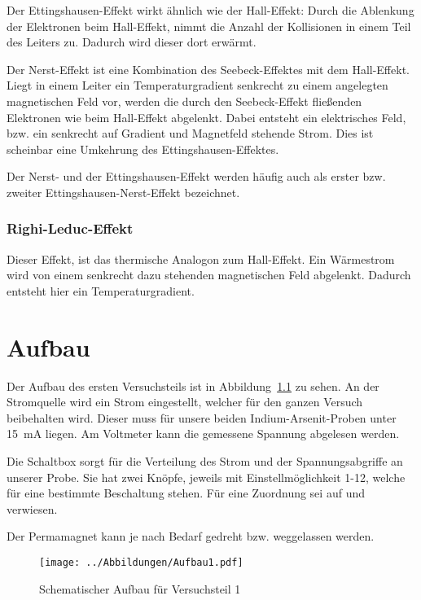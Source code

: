 Der Ettingshausen-Effekt wirkt ähnlich wie der Hall-Effekt: Durch die
Ablenkung der Elektronen beim Hall-Effekt, nimmt die Anzahl der Kollisionen in
einem Teil des Leiters zu. Dadurch wird dieser dort erwärmt.

Der Nerst-Effekt ist eine Kombination des Seebeck-Effektes mit dem Hall-Effekt.
Liegt in einem Leiter ein Temperaturgradient senkrecht zu einem angelegten
magnetischen Feld vor, werden die durch den Seebeck-Effekt fließenden
Elektronen wie beim Hall-Effekt abgelenkt. Dabei entsteht ein elektrisches
Feld, bzw. ein senkrecht auf Gradient und Magnetfeld stehende Strom. Dies ist
scheinbar eine Umkehrung des Ettingshausen-Effektes.

Der Nerst- und der Ettingshausen-Effekt werden häufig auch als erster bzw.
zweiter Ettingshausen-Nerst-Effekt bezeichnet.

\subsection{Righi-Leduc-Effekt}

Dieser Effekt, ist das thermische Analogon zum Hall-Effekt. Ein Wärmestrom wird
von einem senkrecht dazu stehenden magnetischen Feld abgelenkt. Dadurch
entsteht hier ein Temperaturgradient.

\FloatBarrier
\chapter{Aufbau}

Der Aufbau des ersten Versuchsteils ist in Abbildung~\ref{fig:Aufbau1} zu
sehen. An der Stromquelle wird ein Strom eingestellt, welcher für den ganzen
Versuch beibehalten wird. Dieser muss für unsere beiden Indium-Arsenit-Proben
unter \SI{15}{\milli\ampere} liegen. Am Voltmeter kann die gemessene Spannung
abgelesen werden.

Die Schaltbox sorgt für die Verteilung des Strom und der Spannungsabgriffe an
unserer Probe. Sie hat zwei Knöpfe, jeweils mit Einstellmöglichkeit 1-12,
welche für eine bestimmte Beschaltung stehen. Für eine Zuordnung sei auf
\cite[Tab.~4.1]{heldt/Diplomarbeit} und \cite[Tab.~4.2]{heldt/Diplomarbeit}
verwiesen.

Der Permamagnet kann je nach Bedarf gedreht bzw. weggelassen werden.

\begin{figure}
    \centering
    \texttt{[image: ../Abbildungen/Aufbau1.pdf]}
    \caption{%
        Schematischer Aufbau für Versuchsteil 1
    }
    \label{fig:Aufbau1}
\end{figure}

